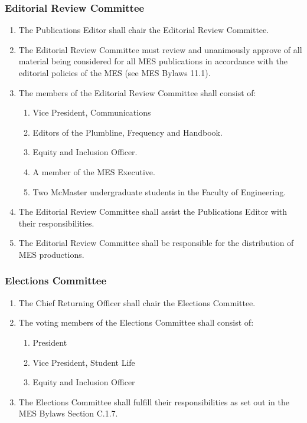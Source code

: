\subsubsection{Editorial Review Committee}
\label{editorial-review-committee}
\begin{enumerate}
 \item
  The Publications Editor shall chair the Editorial Review Committee.
 \item
  The Editorial Review Committee must review and unanimously approve of all material being considered for all MES publications in accordance with the editorial policies of the MES (see MES Bylaws 11.1).
 \item
  The members of the Editorial Review Committee shall consist of:

  \begin{enumerate}
   \item
    Vice President, Communications
   \item
    Editors of the Plumbline, Frequency and Handbook.
   \item
    Equity and Inclusion Officer.
   \item
    A member of the MES Executive.
   \item
    Two McMaster undergraduate students in the Faculty of Engineering.
  \end{enumerate}
 \item
  The Editorial Review Committee shall assist the Publications Editor with their responsibilities.
 \item
  The Editorial Review Committee shall be responsible for the distribution of MES productions.

\end{enumerate}

\subsubsection{Elections Committee}
\label{elections-committee}
\begin{enumerate}
 \item
  The Chief Returning Officer shall chair the Elections Committee.
 \item
  The voting members of the Elections Committee shall consist of:

  \begin{enumerate}
   \item
    President
   \item
    Vice President, Student Life
   \item
    Equity and Inclusion Officer
  \end{enumerate}
 \item
  The Elections Committee shall fulfill their responsibilities as set out in the MES Bylaws Section C.1.7.

\end{enumerate}

